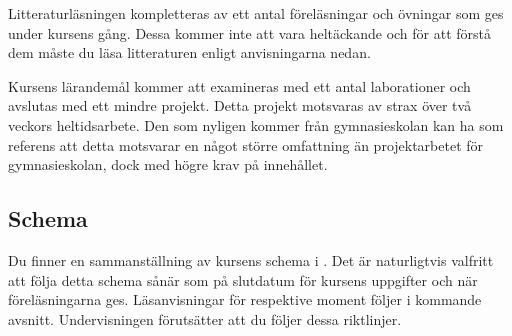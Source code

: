 \documentclass[a4paper,logo]{miunart}
\begin{document}
Litteraturläsningen kompletteras av ett antal föreläsningar och övningar som 
ges under kursens gång.
Dessa kommer inte att vara heltäckande och för att förstå dem måste du läsa 
litteraturen enligt anvisningarna nedan.

Kursens lärandemål kommer att examineras med ett antal laborationer och 
avslutas med ett mindre projekt.
Detta projekt motsvaras av strax över två veckors heltidsarbete.
Den som nyligen kommer från gymnasieskolan kan ha som referens att detta 
motsvarar en något större omfattning än projektarbetet för gymnasieskolan, dock 
med högre krav på innehållet.

\subsection{Schema}
\label{sec:schedule}
Du finner en sammanställning av kursens schema i .
Det är naturligtvis valfritt att följa detta schema sånär som på slutdatum för 
kursens uppgifter och när föreläsningarna ges.
Läsanvisningar för respektive moment följer i kommande avsnitt.
Undervisningen förutsätter att du följer dessa riktlinjer.
\end{document}
